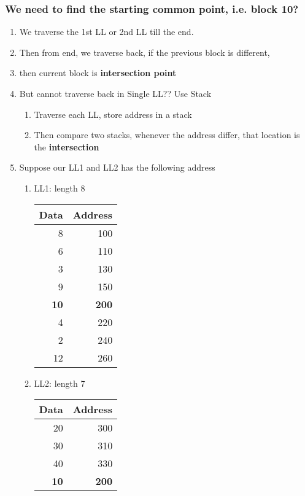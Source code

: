 \documentclass[11pt]{article}
\begin{document}
\subsubsection{We need to find the starting common point, i.e. block \textbf{10}?}
\label{sec:orgd373bf9}
\begin{enumerate}
\item We traverse the 1st LL or 2nd LL till the end.
\label{sec:org6f3a0f7}
\item Then from end, we traverse back, if the previous block is different,
\label{sec:org3de246d}
\item then current block is \textbf{intersection point}
\label{sec:orge3c6257}
\item But cannot traverse back in Single LL?? Use Stack
\label{sec:orgb53a5a5}
\begin{enumerate}
\item Traverse each LL, store address in a stack
\label{sec:orgb6e3c44}
\item Then compare two stacks, whenever the address differ, that location is the \textbf{intersection}
\label{sec:org1af893e}
\end{enumerate}
\item Suppose our LL1 and LL2 has the following address
\label{sec:orgbc54f56}
\begin{enumerate}
\item LL1: length 8
\label{sec:orgba92eef}
\begin{center}
\begin{tabular}{rr}
Data & Address\\
\hline
8 & 100\\
6 & 110\\
3 & 130\\
9 & 150\\
\textbf{10} & \textbf{200}\\
4 & 220\\
2 & 240\\
12 & 260\\
\end{tabular}
\end{center}
\item LL2: length 7
\label{sec:org1a4a35c}
\begin{center}
\begin{tabular}{rr}
Data & Address\\
\hline
20 & 300\\
30 & 310\\
40 & 330\\
\textbf{10} & \textbf{200}\\

\end{tabular}
\end{center}
\end{enumerate}
\end{enumerate}
\end{document}
